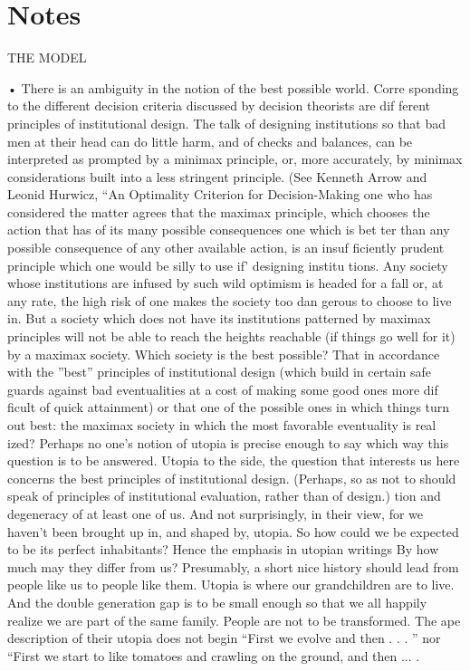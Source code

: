 \documentclass[11pt,openany]{book}
\newcommand{\booknoteshead}{%
  \phantomsection\section*{Notes}%
  \addcontentsline{toc}{section}{Notes}\markright{Notes}}
\begin{document}
\booknoteshead

{\footnotesize\setlength{\parindent}{0pt}\setlength{\parskip}{5pt}

THE MODEL\par

• There is an ambiguity in the notion of the best possible world. Corre sponding to the different decision criteria discussed by decision theorists are dif ferent principles of institutional design. The talk of designing institutions so that bad men at their head can do little harm, and of checks and balances, can be interpreted as prompted by a minimax principle, or, more accurately, by minimax considerations built into a less stringent principle. (See Kenneth Arrow and Leonid Hurwicz, ``An Optimality Criterion for Decision-Making one who has considered the matter agrees that the maximax principle, which chooses the action that has of its many possible consequences one which is bet ter than any possible consequence of any other available action, is an insuf ficiently prudent principle which one would be silly to use if' designing institu tions. Any society whose institutions are infused by such wild optimism is headed for a fall or, at any rate, the high risk of one makes the society too dan gerous to choose to live in. But a society which does not have its institutions patterned by maximax principles will not be able to reach the heights reachable (if things go well for it) by a maximax society. Which society is the best possible? That in accordance with the ''best'' principles of institutional design (which build in certain safe guards against bad eventualities at a cost of making some good ones more dif ficult of quick attainment) or that one of the possible ones in which things turn out best: the maximax society in which the most favorable eventuality is real ized? Perhaps no one's notion of utopia is precise enough to say which way this question is to be answered. Utopia to the side, the question that interests us here concerns the best principles of institutional design. (Perhaps, so as not to should speak of principles of institutional evaluation, rather than of design.) tion and degeneracy of at least one of us. And not surprisingly, in their view, for we haven't been brought up in, and shaped by, utopia. So how could we be expected to be its perfect inhabitants? Hence the emphasis in utopian writings By how much may they differ from us? Presumably, a short nice history should lead from people like us to people like them. Utopia is where our grandchildren are to live. And the double generation gap is to be small enough so that we all happily realize we are part of the same family. People are not to be transformed. The ape description of their utopia does not begin ``First we evolve and then . . . '' nor ``First we start to like tomatoes and crawling on the ground, and then ... .\par

}
\end{document}
